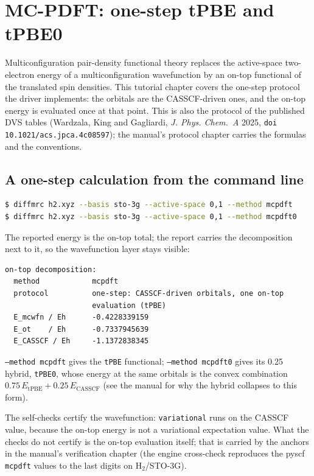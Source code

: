 \section{MC-PDFT: one-step tPBE and tPBE0}
\label{sec:mcpdft}

Multiconfiguration pair-density functional theory replaces the
active-space two-electron energy of a multiconfiguration wavefunction
by an on-top functional of the translated spin densities.  This
tutorial chapter covers the one-step protocol the driver implements:
the orbitals are the CASSCF-driven ones, and the on-top energy is
evaluated once at that point.  This is also the protocol of the
published DVS tables (Wardzala, King and Gagliardi, \emph{J. Phys.
Chem.~A} 2025, \texttt{doi 10.1021/acs.jpca.4c08597}); the manual's
protocol chapter carries the formulas and the conventions.

\subsection{A one-step calculation from the command line}

\begin{lstlisting}[language=bash]
$ diffmrc h2.xyz --basis sto-3g --active-space 0,1 --method mcpdft
$ diffmrc h2.xyz --basis sto-3g --active-space 0,1 --method mcpdft0
\end{lstlisting}

The reported energy is the on-top total; the report carries the
decomposition next to it, so the wavefunction layer stays visible:

\begin{lstlisting}
on-top decomposition:
  method            mcpdft
  protocol          one-step: CASSCF-driven orbitals, one on-top
                    evaluation (tPBE)
  E_mcwfn / Eh      -0.4228339159
  E_ot    / Eh      -0.7337945639
  E_CASSCF / Eh     -1.1372838345
\end{lstlisting}

\texttt{--method mcpdft} gives the \texttt{tPBE} functional;
\texttt{--method mcpdft0} gives its 0.25 hybrid, \texttt{tPBE0}, whose
energy at the same orbitals is the convex combination
$0.75\,E_{\mathrm{tPBE}} + 0.25\,E_{\mathrm{CASSCF}}$ (see the manual
for why the hybrid collapses to this form).

The self-checks certify the wavefunction: \texttt{variational} runs on
the CASSCF value, because the on-top energy is not a variational
expectation value.  What the checks do not certify is the on-top
evaluation itself; that is carried by the anchors in the manual's
verification chapter (the engine cross-check reproduces the pyscf
\texttt{mcpdft} values to the last digits on H$_2$/STO-3G).


